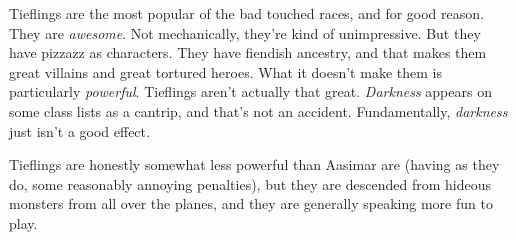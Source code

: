 
Tieflings are the most popular of the bad touched races, and for good reason. They are \textit{awesome}. Not mechanically, they're kind of unimpressive. But they have pizzazz as characters. They have fiendish ancestry, and that makes them great villains and great tortured heroes. What it doesn't make them is particularly \textit{powerful}. Tieflings aren't actually that great. \textit{Darkness} appears on some class lists as a cantrip, and that's not an accident. Fundamentally, \textit{darkness} just isn't a good effect. 

Tieflings are honestly somewhat less powerful than Aasimar are (having as they do, some reasonably annoying penalties), but they are descended from hideous monsters from all over the planes, and they are generally speaking more fun to play.

